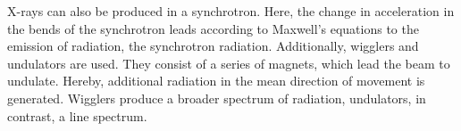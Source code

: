 X-rays can also be produced in a synchrotron. Here, the change in acceleration in the bends of the synchrotron leads according to Maxwell's equations to the emission of radiation, the synchrotron radiation. Additionally, wigglers and undulators are used. They consist of a series of magnets, which lead the beam to undulate. Hereby, additional radiation in the mean direction of movement is generated. Wigglers produce a broader spectrum of radiation, undulators, in contrast, a line spectrum.



